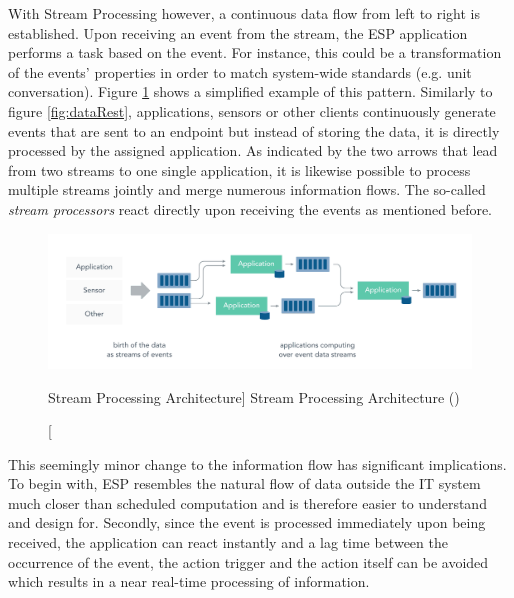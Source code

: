 \begin{enumerate}
    With Stream Processing however, a continuous data flow from left to right is established. Upon receiving an event from the stream, the \acf{ESP} application performs a task based on the event. For instance, this could be a transformation of the events' properties in order to match system-wide standards (e.g. unit conversation). 
    Figure \ref{fig:dataStream} shows a simplified example of this pattern. Similarly to figure \ref{fig:dataRest}, applications, sensors or other clients continuously generate events that are sent to an endpoint but instead of storing the data, it is directly processed by the assigned application. As indicated by the two arrows that lead from two streams to one single application, it is likewise possible to process multiple streams jointly and merge numerous information flows. The so-called \textit{stream processors} react directly upon receiving the events as mentioned before. 
    
    \begin{figure}[ht]
        \includegraphics[width=\linewidth]{images/streaming/streming_data.png}\centering
        \caption
        [Stream Processing Architecture]
        {Stream Processing Architecture (\cite{dataArtisans2017WhatProcessing})}
        \label{fig:dataStream}
    \end{figure}
    
    This seemingly minor change to the information flow has significant implications. To begin with, \acf{ESP} resembles the natural flow of data outside the IT system much closer than scheduled computation and is therefore easier to understand and design for. Secondly, since the event is processed immediately upon being received, the application can react instantly and a lag time between the occurrence of the event, the action trigger and the action itself can be avoided which results in a near real-time processing of information. 
    

\end{enumerate}
